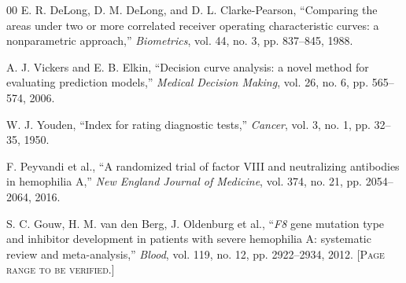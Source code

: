 \documentclass[conference]{IEEEtran}
\begin{document}
\begin{thebibliography}{00}
 E. R. DeLong, D. M. DeLong, and D. L. Clarke-Pearson,
``Comparing the areas under two or more correlated receiver operating
characteristic curves: a nonparametric approach,'' \textit{Biometrics},
vol. 44, no. 3, pp. 837--845, 1988.

 A. J. Vickers and E. B. Elkin, ``Decision curve analysis: a novel
method for evaluating prediction models,'' \textit{Medical Decision Making},
vol. 26, no. 6, pp. 565--574, 2006.

 W. J. Youden, ``Index for rating diagnostic tests,''
\textit{Cancer}, vol. 3, no. 1, pp. 32--35, 1950.

 F. Peyvandi et al., ``A randomized trial of factor VIII and
neutralizing antibodies in hemophilia A,'' \textit{New England Journal of
Medicine}, vol. 374, no. 21, pp. 2054--2064, 2016.

 S. C. Gouw, H. M. van den Berg, J. Oldenburg et al.,
``\textit{F8} gene mutation type and inhibitor development in patients with
severe hemophilia A: systematic review and meta-analysis,'' \textit{Blood},
vol. 119, no. 12, pp. 2922--2934, 2012.
\textsc{[Page range to be verified.]}

\end{thebibliography}
\end{document}
